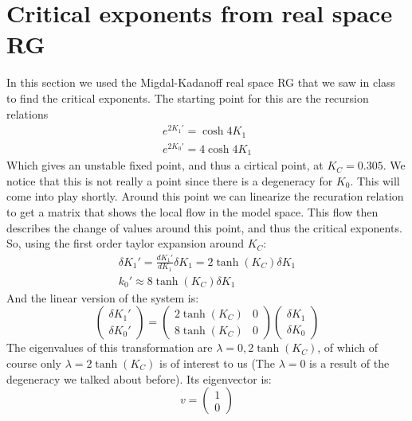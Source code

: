 \documentclass{article}
\begin{document}
\section{Critical exponents from real space RG}
In this section we used the Migdal-Kadanoff real space RG that we saw in class to find the critical exponents. The starting point for this are the recursion relations
\begin{equation}
\begin{gathered}
    e^{2K_1'} = \cosh 4K_1
    \\
    e^{2K_0'} = 4\cosh 4K_1
\end{gathered}
\end{equation}
Which gives an unstable fixed point, and thus a cirtical point, at $K_C = 0.305$. We notice that this is not really a point since there is a degeneracy for $K_0$. This will come into play shortly.
\newline
Around this point we can linearize the recuration relation to get a matrix that shows the local flow in the model space. This flow then describes the change of values around this point, and thus the critical exponents. So, using the first order taylor expansion around $K_C$: 
\begin{equation}
\begin{gathered}
    \delta K_1' = \frac{d K_1'}{d K_1} \delta K_1 = 2\tanh(K_C) \delta K_1
    \\
    k_0' \approx 8\tanh(K_C) \delta K_1
\end{gathered}
\end{equation}
And the linear version of the system is:
\begin{equation}
    \begin{pmatrix}
        \delta K_1' \\ \delta K_0'
    \end{pmatrix} = \begin{pmatrix}
        2\tanh(K_C) & 0 \\ 8\tanh(K_C) & 0
    \end{pmatrix} \begin{pmatrix}
        \delta K_1 \\ \delta K_0
    \end{pmatrix}
\end{equation}
The eigenvalues of this transformation are $\lambda = 0, 2\tanh(K_C)$, of which of course only $\lambda = 2\tanh(K_C)$ is of interest to us (The $\lambda = 0$ is a result of the degeneracy we talked about before). Its eigenvector is:
\begin{equation}
    v = \begin{pmatrix}
        1 \\ 0
    \end{pmatrix}
\end{equation}
\end{document}
